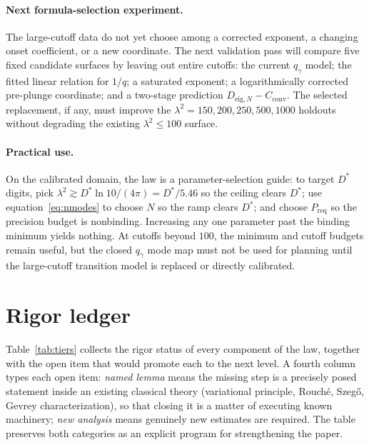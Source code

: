 \documentclass[11pt,a4paper]{article}
\begin{document}
\paragraph{Next formula-selection experiment.}
The large-cutoff data do not yet choose among a corrected exponent, a changing
onset coefficient, or a new coordinate. The next validation pass will compare
five fixed candidate surfaces by leaving out entire cutoffs: the current
$q_\gamma$ model; the fitted linear relation for $1/q$; a saturated exponent;
a logarithmically corrected pre-plunge coordinate; and a two-stage prediction
$D_{\mathrm{eig},N}-C_{\mathrm{conv}}$. The selected replacement, if any,
must improve the $\lambda^2=150,200,250,500,1000$ holdouts without degrading
the existing $\lambda^2\le100$ surface.

\paragraph{Practical use.}
On the calibrated domain, the law is a parameter-selection guide: to target
$D^\ast$ digits, pick $\lambda^2\gtrsim D^\ast\ln10/(4\pi)=D^\ast/5.46$ so the
ceiling clears $D^\ast$; use equation~\eqref{eq:nmodes} to choose $N$ so the
ramp clears $D^\ast$; and choose $P_{\mathrm{req}}$ so the precision budget is
nonbinding. Increasing any one parameter past the binding minimum yields
nothing. At cutoffs beyond $100$, the minimum and cutoff budgets remain useful,
but the closed $q_\gamma$ mode map must not be used for planning until the
large-cutoff transition model is replaced or directly calibrated.

\section{Rigor ledger}\label{sec:rigor}

Table~\ref{tab:tiers} collects the rigor status of every component of the law,
together with the open item that would promote each to the next level. A
fourth column types each open item: \emph{named lemma} means
the missing step is a precisely posed statement inside an existing classical
theory (variational principle, Rouch\'e, Szeg\H{o}, Gevrey characterization),
so that closing it is a matter of executing known machinery; \emph{new
analysis} means genuinely new estimates are required. The table preserves both
categories as an explicit program for strengthening the paper.
\end{document}
